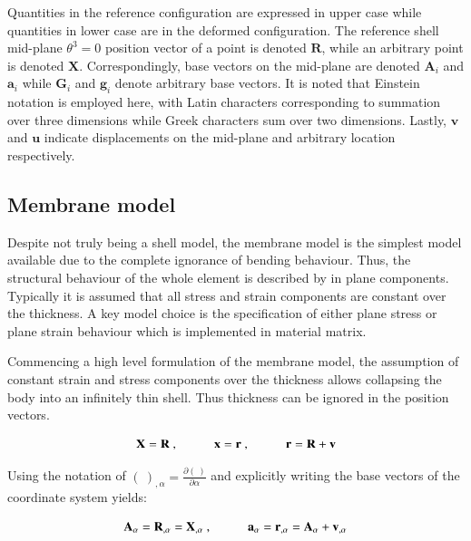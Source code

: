 Quantities in the reference configuration are expressed in upper case while quantities in lower case are in the deformed configuration. The reference shell mid-plane $\theta^3 = 0$ position vector of a point is denoted $\mathbf{R}$, while an arbitrary point is denoted $\mathbf{X}$. Correspondingly, base vectors on the mid-plane are denoted $\mathbf{A}_i$ and $\mathbf{a}_i$ while $\mathbf{G}_i$ and $\mathbf{g}_i$ denote arbitrary base vectors. It is noted that Einstein notation is employed here, with Latin characters corresponding to summation over three dimensions while Greek characters sum over two dimensions. Lastly, $\mathbf{v}$ and $\mathbf{u}$ indicate displacements on the mid-plane and arbitrary location respectively.


\subsection{Membrane model}

Despite not truly being a shell model, the membrane model is the simplest model available due to the complete ignorance of bending behaviour. Thus, the structural behaviour of the whole element is described by in plane components. Typically it is assumed that all stress and strain components are constant over the thickness. A key model choice is the specification of either plane stress or plane strain behaviour which is implemented in material matrix.

Commencing a high level formulation of the membrane model, the assumption of constant strain and stress components over the thickness allows collapsing the body into an infinitely thin shell. Thus thickness can be ignored in the position vectors.

\singlespacing
\begin{equation} 
\mathbf{X} = \mathbf{R}\ ,
\hspace{10mm}
\mathbf{x} = \mathbf{r}\ ,
\hspace{10mm}
\mathbf{r} = \mathbf{R} + \mathbf{v}
\label{eqsmem1a}
\end{equation}

\doublespacing

Using the notation of $(\ )_{,\alpha} = \frac{\partial(\ )}{\partial	\alpha}$ and explicitly writing the base vectors of the coordinate system yields:

\begin{equation} 
\mathbf{A}_\alpha  = \mathbf{R}_{,\alpha} =  \mathbf{X}_{,\alpha}
\ ,
\hspace{10mm}
\mathbf{a}_\alpha  = \mathbf{r}_{,\alpha} = \mathbf{A}_\alpha + \mathbf{v}_{,\alpha}
\label{eqsmem1b}
\end{equation}

